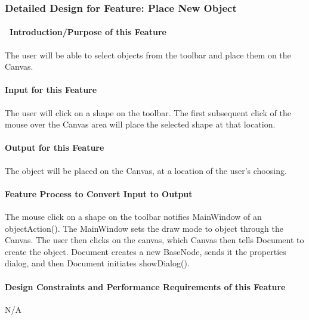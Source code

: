 \documentclass[twoside,letterpaper]{article}
\begin{document}
{\clearpage


% 
%

\subsubsection{Detailed Design for Feature: Place New Object }
\paragraph[\ Introduction/Purpose of this Feature]
{\ Introduction/Purpose of this Feature}
{
The user will be able to select objects from the toolbar and place them on the Canvas.
}

\paragraph[Input for this Feature]{Input for this Feature}
{
The user will click on a shape on the toolbar.  The first subsequent click of the mouse over the Canvas area will place the selected shape at that location.
}

\paragraph{Output for this Feature}
{
The object will be placed on the Canvas, at a location of the user{\textquoteright}s choosing.
}

\paragraph{Feature Process to Convert Input to Output}
{
The mouse click on a shape on the toolbar notifies MainWindow of an objectAction(). The MainWindow sets the draw mode to object through the Canvas. The user then clicks on the canvas, which Canvas then tells Document to create the object. Document creates a new BaseNode, sends it the properties dialog, and then Document initiates showDialog().
}

\paragraph{Design Constraints and Performance Requirements of this Feature}
{
N/A
}
\bigskip
\bigskip

}
\end{document}
